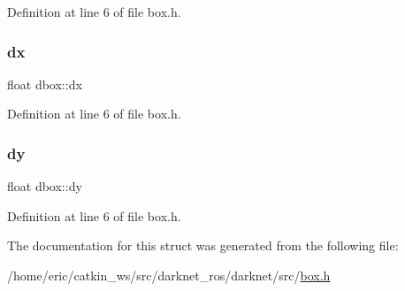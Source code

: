 Definition at line 6 of file box.\+h.

\mbox{\label{structdbox_af24e1ef9eae9dbcfefbcd86cc7ab342f}} 
\subsubsection{\texorpdfstring{dx}{dx}}
{\footnotesize\ttfamily float dbox\+::dx}



Definition at line 6 of file box.\+h.

\mbox{\label{structdbox_acfa3fcbd522bc347d91b27229a935e1b}} 
\subsubsection{\texorpdfstring{dy}{dy}}
{\footnotesize\ttfamily float dbox\+::dy}



Definition at line 6 of file box.\+h.



The documentation for this struct was generated from the following file\+:\begin{DoxyCompactItemize}
\item 
/home/eric/catkin\+\_\+ws/src/darknet\+\_\+ros/darknet/src/\mbox{\hyperlink{box_8h}{box.\+h}}\end{DoxyCompactItemize}
